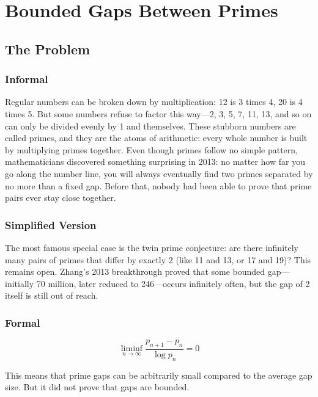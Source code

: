 \let\LocalMacro\relax

\chapter{Bounded Gaps Between Primes}

\section{The Problem}

\subsection{Informal}
Regular numbers can be broken down by multiplication: 12 is 3 times 4, 20 is 4 times 5. But some numbers refuse to factor this way---2, 3, 5, 7, 11, 13, and so on can only be divided evenly by 1 and themselves. These stubborn numbers are called primes, and they are the atoms of arithmetic: every whole number is built by multiplying primes together. Even though primes follow no simple pattern, mathematicians discovered something surprising in 2013: no matter how far you go along the number line, you will always eventually find two primes separated by no more than a fixed gap. Before that, nobody had been able to prove that prime pairs ever stay close together.

\subsection{Simplified Version}
The most famous special case is the twin prime conjecture: are there infinitely many pairs of primes that differ by exactly 2 (like 11 and 13, or 17 and 19)? This remains open. Zhang's 2013 breakthrough proved that some bounded gap---initially 70 million, later reduced to 246---occurs infinitely often, but the gap of 2 itself is still out of reach.

\subsection{Formal}
\begin{equation}
\liminf_{n \to \infty} \frac{p_{n+1} - p_n}{\log p_n} = 0
\end{equation}

This means that prime gaps can be arbitrarily small compared to the average gap size. But it did not prove that gaps are bounded.

